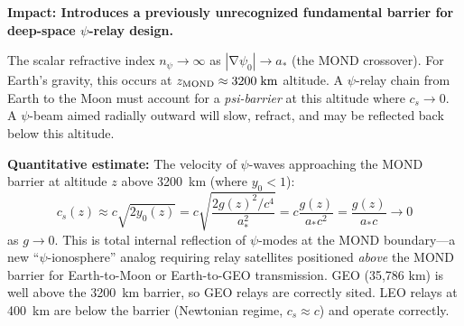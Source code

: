 \documentclass[aps,prd,twocolumn,superscriptaddress]{revtex4-2}
\newcommand{\npsi}{n_\psi}
\DeclareMathOperator{\grad}{\nabla}
\begin{document}
\begin{tcolorbox}[colback=yellow!5!white,colframe=orange!75!black,title=
{Finding \#3: MOND Mirror at 3200 km --- New Relay Design Constraint}]
\textbf{Impact: Introduces a previously unrecognized fundamental barrier for deep-space $\psi$-relay design.}

The scalar refractive index $\npsi \to \infty$ as $|\grad\psi_0| \to a_*$
(the MOND crossover).  For Earth's gravity, this occurs at
$z_{\rm MOND} \approx 3200\;\si{km}$ altitude.  A $\psi$-relay chain from
Earth to the Moon must account for a \emph{psi-barrier} at this altitude
where $c_s \to 0$.  A $\psi$-beam aimed radially outward will slow,
refract, and may be reflected back below this altitude.

\textbf{Quantitative estimate:}  The velocity of $\psi$-waves approaching
the MOND barrier at altitude $z$ above 3200~km (where $y_0 < 1$):
\begin{equation}
c_s(z) \approx c\sqrt{2y_0(z)} = c\sqrt{\frac{2g(z)^2/c^4}{a_*^2}}
= c\frac{g(z)}{a_*c^2} = \frac{g(z)}{a_*c} \to 0
\end{equation}
as $g \to 0$.  This is total internal reflection of $\psi$-modes at the
MOND boundary---a new ``$\psi$-ionosphere'' analog requiring relay
satellites positioned \emph{above} the MOND barrier for Earth-to-Moon
or Earth-to-GEO transmission.  GEO (35,786 km) is well above the
3200~km barrier, so GEO relays are correctly sited.  LEO relays at
400~km are below the barrier (Newtonian regime, $c_s \approx c$) and
operate correctly.
\end{tcolorbox}
\end{document}
